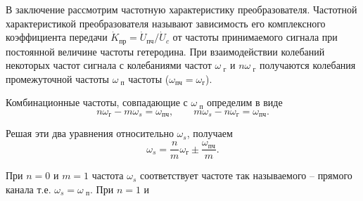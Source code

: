 \documentclass[14pt]{extarticle}
\begin{document}
	В заключение рассмотрим частотную характеристику преобразователя. Частотной характеристикой преобразователя называют зависимость его комплексного коэффициента передачи \(\dot{K}_\text{пр} = \dot{U}_\text{пч}/\dot{U}_c\) от частоты принимаемого сигнала при постоянной величине частоты гетеродина. При взаимодействии колебаний некоторых частот сигнала с колебаниями частот \(\omega_\text{ г}\) и \(n\omega_\text{ г}\) получаются колебания промежуточной частоты \(\omega_\text{ п}\) частоты (\(\omega_\text{пч} = \omega_\text{г}\)).
	
	Комбинационные частоты, совпадающие с \(\omega_\text{ п}\) определим в виде
	\[
	n\omega_\text{г} - m\omega_s = \omega_\text{пч}, \qquad m\omega_s - n\omega_\text{г} = \omega_\text{пч}.
	\]
	
	Решая эти два уравнения относительно \(\omega_s\), получаем
	\[
		\omega_s = \frac{n}{m} \omega_\text{г} \pm \frac{\omega_\text{пч}}{m}.
	\]
	
	При \(n = 0\) и \(m = 1\) частота \(\omega_s\) соответствует частоте так называемого -- прямого канала т.е. \(\omega_s = \omega_\text{ п}\). При \(n = 1\) и
\end{document}
